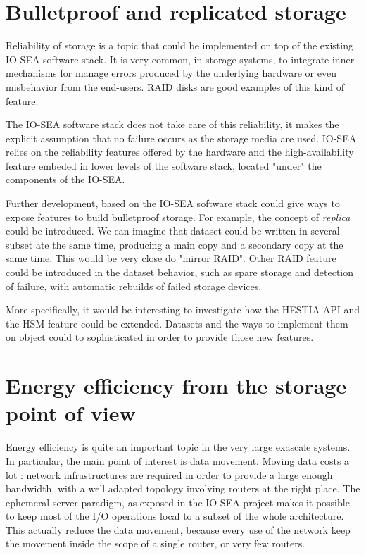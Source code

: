 \section{Bulletproof and replicated storage}

Reliability of storage is a topic that could be implemented on top of the existing IO-SEA software stack. It is
very common, in storage systems, to integrate inner mechanisms for manage errors produced by the underlying 
hardware or even misbehavior from the end-users. RAID disks are good examples of this kind of feature. 

The IO-SEA software stack does not take care of this reliability, it makes the explicit assumption that no
failure occurs as the storage media are used. IO-SEA relies on the reliability features offered by the hardware
and the high-availability feature embeded in lower levels of the software stack, located "under" the components
of the IO-SEA. 

Further development, based on the IO-SEA software stack could give ways to expose features to build bulletproof
storage. For example, the concept of \textit{replica} could be introduced. We can imagine that dataset could be
written in several subset ate the same time, producing a main copy and a secondary copy at the same time. This 
would be very close do "mirror RAID". Other RAID feature could be introduced in the dataset behavior, such as 
spare storage and detection of failure, with automatic rebuilds of failed storage devices. 

More specifically, it would be interesting to investigate how the HESTIA API and the HSM feature could be 
extended. Datasets and the ways to implement them on object could to sophisticated in order to provide those new
features. 

\section{Energy efficiency from the storage point of view}

Energy efficiency is quite an important topic in the very large exascale systems. In particular, the main 
point of interest is data movement. Moving data costs a lot : network infrastructures are required in order to
provide a large enough bandwidth, with a well adapted topology involving routers at the right place. The 
ephemeral server paradigm, as exposed in the IO-SEA project makes it possible to keep most of the I/O operations
local to a subset of the whole architecture. This actually reduce the data movement, because every use of the
network keep the movement inside the scope of a single router, or very few routers. 

